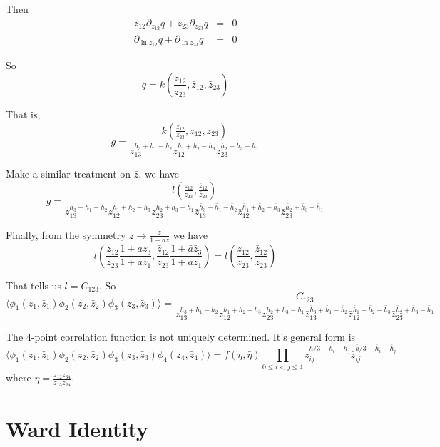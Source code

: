 \documentclass[12pt]{book}
\begin{document}
	Then
	\begin{eqnarray}
		z_{12}\partial_{z_{12}}q+z_{23}\partial_{z_{23}}q&=&0\\
		\partial_{\ln z_{12}}q+\partial_{\ln z_{23}}q&=&0
	\end{eqnarray}
	
	So
	\begin{equation}
		q=k(\frac{z_{12}}{z_{23}},\bar z_{12},\bar z_{23})
	\end{equation}
	
	That is,
	\begin{equation}
		g=\frac {k(\frac{z_{12}}{z_{23}},\bar z_{12},\bar z_{23})}{z_{13}^{h_3+h_1-h_2}z_{12}^{h_1+h_2-h_3}z_{23}^{h_2+h_3-h_1}}
	\end{equation}
	
	Make a similar treatment on $\bar z$, we have
	\begin{equation}
		g=\frac {l(\frac{z_{12}}{z_{23}},\frac{\bar z_{12}}{\bar z_{23}})}{z_{13}^{h_3+h_1-h_2}z_{12}^{h_1+h_2-h_3}z_{23}^{h_2+h_3-h_1}\bar z_{13}^{\bar h_3+\bar h_1-\bar h_2}\bar z_{12}^{\bar h_1+\bar h_2-\bar h_3}\bar z_{23}^{\bar h_2+\bar h_3-\bar h_1}}
	\end{equation}
	
	Finally, from the symmetry $z\rightarrow \frac z{1+az}$ we have
	\begin{equation}
		l(\frac{z_{12}}{z_{23}}\frac{1+az_3}{1+az_1},\frac{\bar z_{12}}{\bar z_{23}}\frac{1+\bar a\bar z_3}{1+\bar a\bar z_1})=l(\frac{z_{12}}{z_{23}},\frac{\bar z_{12}}{\bar z_{23}})
	\end{equation}
	
	That tells us $l=C_{123}$. So
	\begin{equation}
		\langle \phi_1(z_1,\bar z_1)\phi_2(z_2,\bar z_2)\phi_3(z_3,\bar z_3)\rangle=\frac {C_{123}}{z_{13}^{h_3+h_1-h_2}z_{12}^{h_1+h_2-h_3}z_{23}^{h_2+h_3-h_1}\bar z_{13}^{\bar h_3+\bar h_1-\bar h_2}\bar z_{12}^{\bar h_1+\bar h_2-\bar h_3}\bar z_{23}^{\bar h_2+\bar h_3-\bar h_1}}
	\end{equation}
	
	The 4-point correlation function is not uniquely determined. It's general form is
	\begin{equation}
		\langle \phi_1(z_1,\bar z_1)\phi_2(z_2,\bar z_2)\phi_3(z_3,\bar z_3)\phi_4(z_4,\bar z_4)\rangle=f(\eta,\bar \eta)\prod_{0\leq i<j\leq4} z_{ij}^{h/3-h_i-h_j}\bar z_{ij}^{\bar h/3-\bar h_i-\bar h_j}
	\end{equation}
	where $\eta=\frac{z_{12}z_{34}}{z_{13}z_{24}}$.
	\section{Ward Identity}
	
\end{document}
